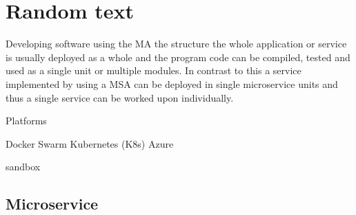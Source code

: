\section{Random text}

Developing software using the MA the structure the whole application or service 
is usually deployed as a whole and the program code can be compiled, tested and
used as a single unit or multiple modules. In contrast to this a service implemented 
by using a MSA can be deployed in single microservice units and thus a single service 
can be worked upon individually.


Platforms

Docker Swarm
Kubernetes (K8s)
Azure

sandbox






\begin{sloppypar}

\end{sloppypar}

\subsection{Microservice}






